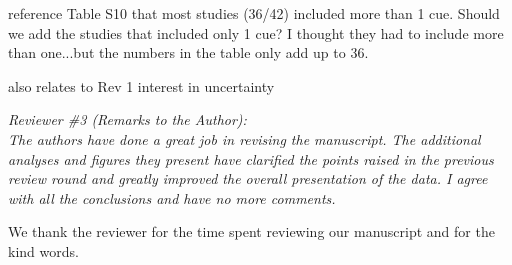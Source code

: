 \documentclass[11pt, a4paper]{article}
\begin{document}
\par reference Table  S10 that most studies (36/42)  included more than 1 cue. Should we add the studies that included only 1 cue? I thought they had to include more than one...but the numbers in the table only add up to 36.
\par also relates to Rev 1 interest in uncertainty

 \emph{Reviewer \#3 (Remarks to the Author):}\\

\emph{The authors have done a great job in revising the manuscript. The additional analyses and figures they present have clarified the points raised in the previous review round and greatly improved the overall presentation of the data. I agree with all the conclusions and have no more comments.}

\par We thank the reviewer for the time spent reviewing our manuscript and for the kind words. 

\end{document}
